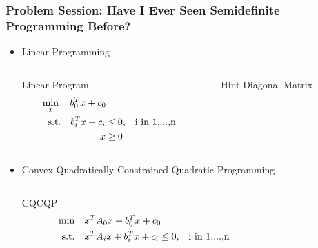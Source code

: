 \documentclass[11pt]{beamer}
\begin{document}
	\begin{frame}
		\frametitle{Problem Session: \newline Have I Ever Seen Semidefinite Programming Before?}
		\begin{itemize}[leftmargin=-0.3cm]
		\item Linear Programming\\
		\begin{columns}
			\begin{column}{0.5\textwidth}
				\begin{block}{Linear Program}
					\scriptsize
					\abovedisplayskip=0pt
					\abovedisplayshortskip=0pt 
					\belowdisplayskip=0pt
					\belowdisplayshortskip=0pt 
					\begin{equation*}
					\begin{aligned}
					\min_x\quad  b_0^Tx+c_0\quad\\
					\text{s.t.}\quad  b_i^Tx+c_i\leq&  \:0\text{,\quad i in 1,...,n}\\
					 x\geq& \:0
					\end{aligned}
					\end{equation*}
				\end{block}
			\end{column}
			\begin{column}{0.5\textwidth}
				\begin{block}{Hint}
					Diagonal Matrix
				\end{block}
			\end{column}
		\end{columns}
		\item Convex Quadratically Constrained Quadratic Programming\\
		\begin{columns}
		\begin{column}{0.5\textwidth}
		\begin{block}{CQCQP}
		\scriptsize
		\abovedisplayskip=0pt
		\abovedisplayshortskip=0pt 
		\belowdisplayskip=0pt
		\belowdisplayshortskip=0pt 
		\begin{equation*}
		\begin{aligned}
		\min\quad &x^TA_0x+b_0^Tx+c_0\\
		\text{s.t.}\quad &x^TA_ix+b_i^Tx+c_i\leq 0\text{,\quad i in 1,...,n}
		\end{aligned}
		\end{equation*}
		\end{block}
		\end{column}
		\begin{column}{0.5\textwidth}

\end{column}
\end{columns}
\end{itemize}
\end{frame}
\end{document}
